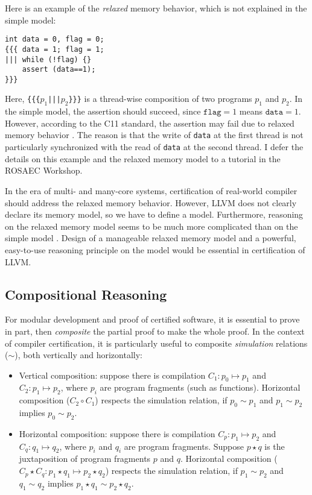 \documentclass[nocopyrightspace]{sigplanconf}
\begin{document}
Here is an example of the \emph{relaxed} memory behavior, which is not
explained in the simple model:
\begin{verbatim}
int data = 0, flag = 0;
{{{ data = 1; flag = 1;
||| while (!flag) {}
    assert (data==1);
}}}
\end{verbatim}
Here, \texttt{\{\{\{$p_1$|||$p_2$\}\}\}} is a thread-wise composition
of two programs $p_1$ and $p_2$.  In the simple model, the assertion
should succeed, since $\texttt{flag}=1$ means $\texttt{data}=1$.
However, according to the C11 standard, the assertion may fail due to
relaxed memory behavior \cite{TODO}.  The reason is that the write of
\texttt{data} at the first thread is not particularly synchronized
with the read of \texttt{data} at the second thread.  I defer the
details on this example and the relaxed memory model to a tutorial in
the ROSAEC Workshop.

In the era of multi- and many-core systems, certification of
real-world compiler should address the relaxed memory behavior.
However, LLVM does not clearly declare its memory model, so we have to
define a model.  Furthermore, reasoning on the relaxed memory model
seems to be much more complicated than on the simple model
\cite{TODO}.  Design of a manageable relaxed memory model and a
powerful, easy-to-use reasoning principle on the model would be
essential in certification of LLVM.

\subsection{Compositional Reasoning}\label{sec:compose}

For modular development and proof of certified software, it is
essential to prove in part, then \emph{composite} the partial proof to
make the whole proof.  In the context of compiler certification, it is
particularly useful to composite \emph{simulation} relations ($\sim$),
both vertically and horizontally:
\begin{itemize}
\item Vertical composition: suppose there is compilation $C_1: p_0
  \mapsto p_1$ and $C_2: p_1 \mapsto p_2$, where $p_i$ are program
  fragments (such as functions).  Horizontal composition ($C_2 \circ
  C_1$) respects the simulation relation, if $p_0 \sim p_1$ and $p_1
  \sim p_2$ implies $p_0 \sim p_2$.
\item Horizontal composition: suppose there is compilation $C_p: p_1
  \mapsto p_2$ and $C_q: q_1 \mapsto q_2$, where $p_i$ and $q_i$ are
  program fragments.  Suppose $p \star q$ is the juxtaposition of
  program fragments $p$ and $q$.  Horizontal composition ($C_p \star
  C_q: p_1 \star q_1 \mapsto p_2 \star q_2$) respects the simulation
  relation, if $p_1 \sim p_2$ and $q_1 \sim q_2$ implies $p_1 \star
  q_1 \sim p_2 \star q_2$.
\end{itemize}
\end{document}
